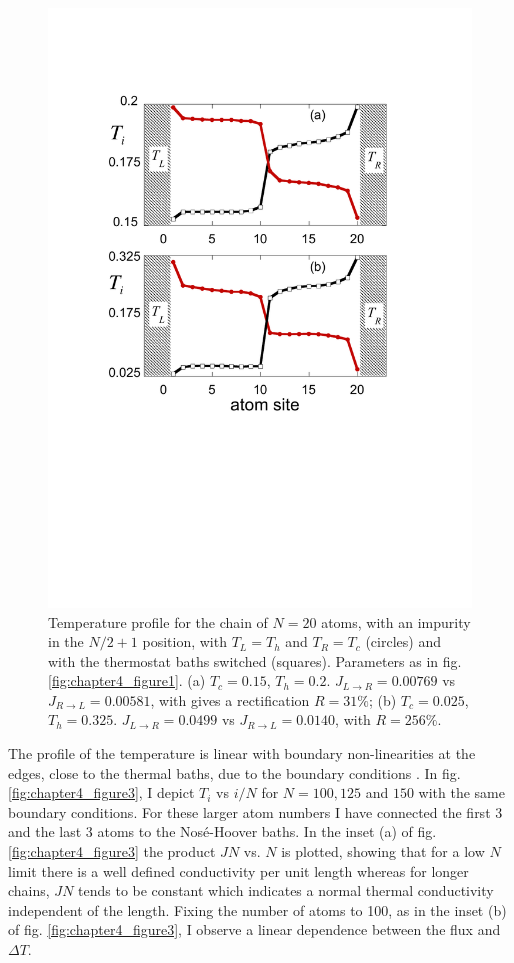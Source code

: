 \begin{figure}
\centering
\includegraphics[width=0.65\linewidth]{Figures/FIG4b.pdf}
\caption{Temperature profile for the chain of $N=20$ atoms, with an impurity in the $N/2+1$ position, with $T_L=T_h$ and $T_R=T_c$ (circles) and with the thermostat baths switched (squares).
Parameters as in fig. \ref{fig:chapter4_figure1}.
(a) $T_c=0.15$, $T_h=0.2$. $J_{L\rightarrow R}=0.00769$ vs $J_{R\rightarrow L}=0.00581$, with gives a rectification $R=31 \% $; (b) $T_c=0.025$, $T_h=0.325$. $J_{L\rightarrow R}=0.0499$ vs  $J_{R\rightarrow L}=0.0140$, with $R=256 \%$.}
\label{fig:chapter4_figure4}
\end{figure}

The profile of the temperature is linear with boundary non-linearities at the edges, close to the thermal baths,  due to the boundary conditions \cite{Lepri1997}. In fig. \ref{fig:chapter4_figure3}, I depict $T_i$ vs $i/N$ for $N=100, 125$ and $150$ with the same boundary conditions. For these
larger atom numbers  I have connected the first 3 and the last 3 atoms to the Nos\'e-Hoover baths.
In the inset (a) of fig. \ref{fig:chapter4_figure3}  the product $JN$ vs. $N$ is plotted, showing that for a low $N$ limit there is a well defined conductivity per unit length whereas for longer chains, $JN$ tends to be constant  which indicates a normal thermal conductivity independent of the length. Fixing the number of atoms to 100, as in the inset (b) of fig. \ref{fig:chapter4_figure3},  I observe a linear dependence between the flux and $\Delta T$.


